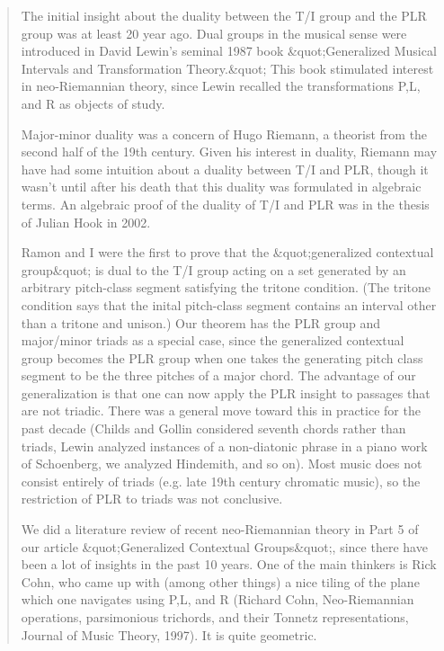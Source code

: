 \begin{quote}
  The initial insight about the duality between the T/I group and 
  the PLR group was at least 20 year ago.  Dual groups in the musical
  sense were introduced in David Lewin's seminal 1987 book &quot;Generalized
  Musical Intervals and Transformation Theory.&quot;  This book stimulated
  interest in neo-Riemannian theory, since Lewin recalled the
  transformations P,L, and R as objects of study.

  Major-minor duality was a concern of Hugo Riemann, a theorist from
  the second half of the 19th century.  Given his interest in duality,
  Riemann may have had some intuition about a duality between T/I and
  PLR, though it wasn't until after his death that this duality was
  formulated in algebraic terms.  An algebraic proof of the duality of
  T/I and PLR was in the thesis of Julian Hook in 2002.
   
  Ramon and I were the first to prove that the &quot;generalized contextual 
  group&quot; is dual to the T/I group acting on a set generated by an 
  arbitrary pitch-class segment satisfying the tritone condition.  
  (The tritone condition says that the inital pitch-class segment 
  contains an interval other than a tritone and unison.)  Our 
  theorem has the PLR group and major/minor triads as a special case,
  since the generalized contextual group becomes the PLR group when one
  takes the generating pitch class segment to be the three pitches of a
  major chord.  The advantage of our generalization is that one can now
  apply the PLR insight to passages that are not triadic.  There was a
  general move toward this in practice for the past decade (Childs and
  Gollin considered seventh chords rather than triads, Lewin analyzed
  instances of a non-diatonic phrase in a piano work of Schoenberg, we
  analyzed Hindemith, and so on).  Most music does not consist entirely
  of triads (e.g. late 19th century chromatic music), so the restriction
  of PLR to triads was not conclusive.
   
  We did a literature review of recent neo-Riemannian theory in Part 
  5 of our article &quot;Generalized Contextual Groups&quot;, since there have 
  been a lot of insights in the past 10 years.  One of the main
  thinkers is Rick Cohn, who came up with (among other things) a 
  nice tiling of the plane which one navigates using P,L, and R 
  (Richard Cohn, Neo-Riemannian operations, parsimonious trichords, 
  and their Tonnetz representations, Journal of Music Theory, 1997).  
  It is quite geometric. 

\end{quote}
    
